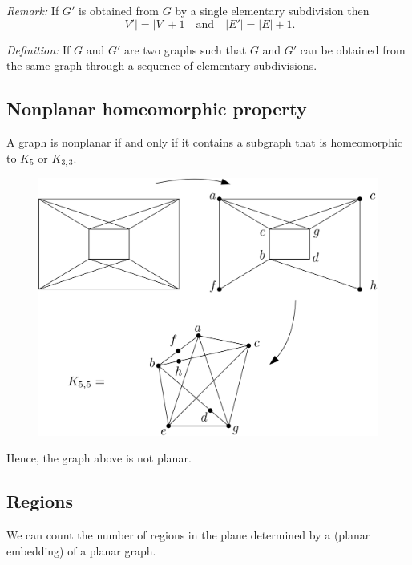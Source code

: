 \documentclass[11pt]{article}
\begin{document}
    \vspace{1em}

    \emph{Remark:} If \(G'\) is obtained from $G$ by a single elementary subdivision then \[|V'| = |V| + 1 \quad \text{and} \quad |E'| = |E| + 1.\]

    \emph{Definition:} If $G$ and $G'$ are two graphs such that $G$ and $G'$ can be obtained from the same graph through a sequence of elementary subdivisions.

    \subsection{Nonplanar homeomorphic property}

    A graph is nonplanar if and only if it contains a subgraph that is homeomorphic to \(K_5\) or \(K_{3,3}\).

    \begin{figure}[H]
        \centering
        \includegraphics[scale=0.2]{homo2.png}
    \end{figure}
    Hence, the graph above is not planar.

    \subsection{Regions}

    We can count the number of regions in the plane determined by a (planar embedding) of a planar graph.
\end{document}
